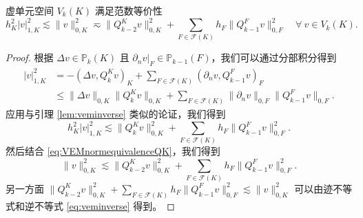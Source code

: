 \begin{lemma}
虚单元空间 $V_k(K)$ 满足范数等价性
\begin{equation}\label{eq:Vknormequivalence}
h_K^2|v|_{1,K}^2\lesssim\|v\|_{0,K}^2\eqsim \|Q_{k-2}^Kv\|_{0,K}^2+\sum_{F\in\mathcal F(K)}h_F\|Q_{k-1}^Fv\|_{0,F}^2 \quad\forall~v\in V_k(K).
\end{equation}
\end{lemma}
\begin{proof}
根据 $\Delta v\in\mathbb P_{k}(K)$ 且 $\partial_nv|_F\in\mathbb P_{k-1}(F)$，我们可以通过分部积分得到
\begin{align*}
|v|_{1,K}^2&=-(\Delta v,Q_k^Kv)_K+\sum_{F\in\mathcal F(K)}(\partial_nv,Q_{k-1}^Fv)_{F} \\
&\leq\|\Delta v\|_{0,K}\|Q_k^Kv\|_{0,K}+\sum_{F\in\mathcal F(K)}\|\partial_nv\|_{0,F}\|Q_{k-1}^Fv\|_{0,F}.
\end{align*}
应用与引理 \ref{lem:veminverse} 类似的论证，我们得到
\[
h_K^2|v|_{1,K}^2\lesssim \|Q_k^Kv\|_{0,K}^2+\sum_{F\in\mathcal F(K)}h_F\|Q_{k-1}^Fv\|_{0,F}^2.
\]
然后结合 \eqref{eq:VEMnormequivalenceQK}，我们得到
\[
\|v\|_{0,K}^2\lesssim \|Q_{k-2}^Kv\|_{0,K}^2+\sum_{F\in\mathcal F(K)}h_F\|Q_{k-1}^Fv\|_{0,F}^2.
\]
另一方面 $\|Q_{k-2}^Kv\|_{0,K}^2+\sum\limits_{F\in\mathcal F(K)}h_F\|Q_{k-1}^Fv\|_{0,F}^2\lesssim \|v\|_{0,K}^2$ 可以由迹不等式和逆不等式 \eqref{eq:veminverse} 得到。
\end{proof}

